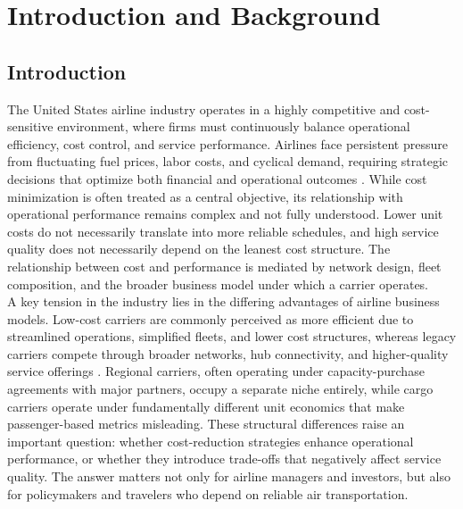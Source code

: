 \documentclass[11pt, letterpaper]{article}
\begin{document}
\section{Introduction and Background}
\subsection{Introduction}
The United States airline industry operates in a highly competitive and cost-sensitive environment, where firms must continuously balance operational efficiency, cost control, and service performance. Airlines face persistent pressure from fluctuating fuel prices, labor costs, and cyclical demand, requiring strategic decisions that optimize both financial and operational outcomes \cite{Barbot2008,Gillen2005,Fan2016}. While cost minimization is often treated as a central objective, its relationship with operational performance remains complex and not fully understood. Lower unit costs do not necessarily translate into more reliable schedules, and high service quality does not necessarily depend on the leanest cost structure. The relationship between cost and performance is mediated by network design, fleet composition, and the broader business model under which a carrier operates.\\
\indent A key tension in the industry lies in the differing advantages of airline business models. Low-cost carriers are commonly perceived as more efficient due to streamlined operations, simplified fleets, and lower cost structures, whereas legacy carriers compete through broader networks, hub connectivity, and higher-quality service offerings \cite{Barbot2008,Fan2016,Gillen2005}. Regional carriers, often operating under capacity-purchase agreements with major partners, occupy a separate niche entirely, while cargo carriers operate under fundamentally different unit economics that make passenger-based metrics misleading. These structural differences raise an important question: whether cost-reduction strategies enhance operational performance, or whether they introduce trade-offs that negatively affect service quality. The answer matters not only for airline managers and investors, but also for policymakers and travelers who depend on reliable air transportation.\\
\end{document}

